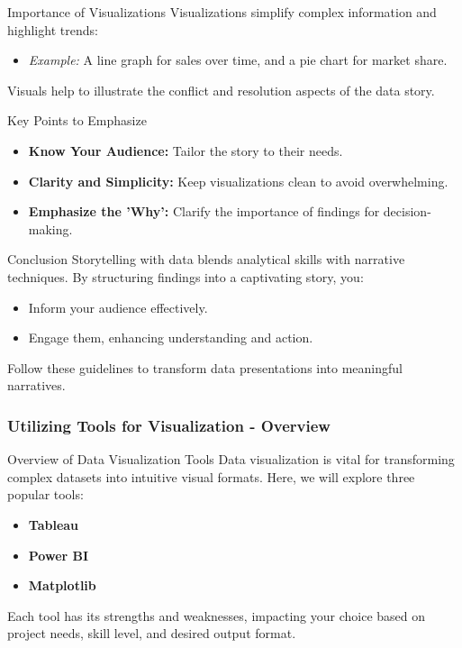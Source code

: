 \documentclass[aspectratio=169]{beamer}
\begin{document}
\begin{frame}[fragile]{Importance of Visualizations}
    Visualizations simplify complex information and highlight trends:
    \begin{itemize}
        \item \textit{Example:} A line graph for sales over time, and a pie chart for market share.
    \end{itemize}
    Visuals help to illustrate the conflict and resolution aspects of the data story.
\end{frame}

\begin{frame}[fragile]{Key Points to Emphasize}
    \begin{itemize}
        \item \textbf{Know Your Audience:} Tailor the story to their needs.
        \item \textbf{Clarity and Simplicity:} Keep visualizations clean to avoid overwhelming.
        \item \textbf{Emphasize the 'Why':} Clarify the importance of findings for decision-making.
    \end{itemize}
\end{frame}

\begin{frame}[fragile]{Conclusion}
    Storytelling with data blends analytical skills with narrative techniques. By structuring findings into a captivating story, you:
    \begin{itemize}
        \item Inform your audience effectively.
        \item Engage them, enhancing understanding and action.
    \end{itemize}
    Follow these guidelines to transform data presentations into meaningful narratives.
\end{frame}

\begin{frame}[fragile]
    \frametitle{Utilizing Tools for Visualization - Overview}
    \begin{block}{Overview of Data Visualization Tools}
        Data visualization is vital for transforming complex datasets into intuitive visual formats. Here, we will explore three popular tools: 
        \begin{itemize}
            \item \textbf{Tableau}
            \item \textbf{Power BI}
            \item \textbf{Matplotlib}
        \end{itemize}
        Each tool has its strengths and weaknesses, impacting your choice based on project needs, skill level, and desired output format.
    \end{block}
\end{frame}
\end{document}
